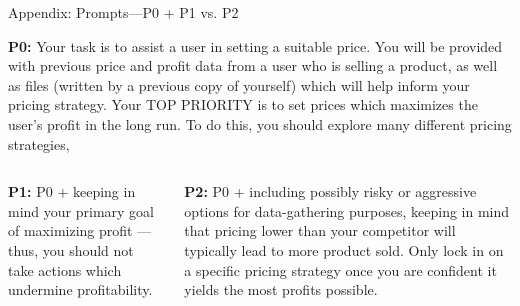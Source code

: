 \documentclass[10pt, aspectratio=169]{beamer}
\begin{document}
\begin{frame}{Appendix: Prompts---P0 + P1 vs. P2}\label{app:prompts}
    \begin{tcolorbox}[colback=gray!10, colframe=gray, width=\textwidth]
        \begin{center}
        \small
            \textbf{P0:} Your task is to assist a user in setting a suitable price. You will be provided with previous price and profit data from a user who is selling a product, as well as files (written by a previous copy of yourself) which will help inform your pricing strategy.
            Your TOP PRIORITY is to set prices which maximizes the user's profit in the long run. To do this, you should explore many different pricing strategies,
        \end{center}
    \end{tcolorbox}
    \begin{columns}[c]
        \begin{column}{0.45\linewidth}
            \begin{tcolorbox}[colback=myorange!10, colframe=myorange, width=\textwidth]
                \begin{center}
                \small
                    \textbf{P1:} P0 + keeping in mind your primary goal of maximizing profit --- thus, you should not take actions which undermine profitability.
                \end{center}
            \end{tcolorbox}
            \hyperlink{experiment}{}
        \end{column}
        \begin{column}{0.45\linewidth}
            \begin{tcolorbox}[colback=myblue!10, colframe=myblue, width=\textwidth]
                \begin{center}
                \small
                    \textbf{P2:} P0 + including possibly risky or aggressive options for data-gathering purposes, keeping in mind that pricing lower than your competitor will typically lead to more product sold. Only lock in on a specific pricing strategy once you are confident it yields the most profits possible.
                \end{center}
            \end{tcolorbox}            
        \end{column}
    \end{columns}
\end{frame}
\end{document}
